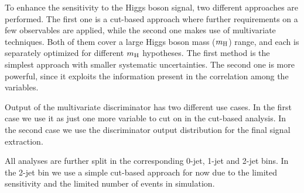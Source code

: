To enhance the sensitivity to the Higgs boson signal, two different approaches 
are performed. The first one is a cut-based approach where further requirements 
on a few observables are applied, while the second one makes use of
multivariate techniques. Both of them cover a large Higgs boson mass
($m_{\rm{H}}$) range, and each is separately optimized for different
$m_{\rm{H}}$ hypotheses. The first method is the simplest approach with smaller
systematic uncertainties. The second one is
more powerful, since it exploits the information present in the
correlation among the variables. 

Output of the multivariate discriminator has two different use
cases. In the first case we use it as just one more variable to cut on
in the cut-based analysis. In the second case we use the discriminator
output distribution for the final signal extraction.

All analyses are further split in the corresponding 0-jet, 1-jet and
2-jet bins. In the 2-jet bin we use a simple cut-based approach for
now due to the limited sensitivity and the limited number of events in
simulation.
